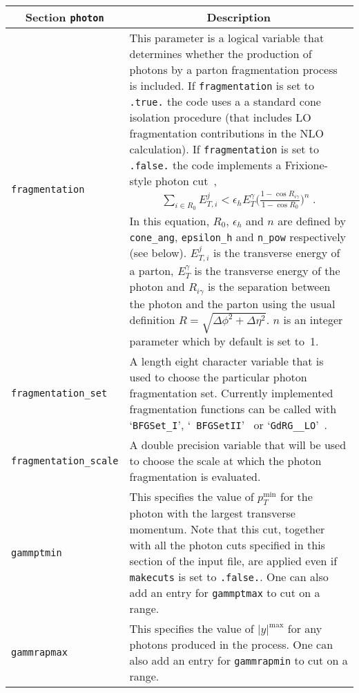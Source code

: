 	\begin{longtable}{p{3.5cm}p{12cm}}
		\toprule
		\multicolumn{1}{c}{{\textbf{Section} \texttt{photon}}} & \multicolumn{1}{c}{{\textbf{Description}}} \\ 
		\midrule
		{\tt fragmentation} &  This parameter is a logical variable that determines whether the production of photons 
		by a parton 
		fragmentation process is included. If {\tt fragmentation} is set to {\tt .true.} the code uses a a standard 
		cone isolation
		procedure (that includes LO fragmentation contributions in the NLO calculation).
		If {\tt fragmentation} is set to {\tt .false.} the code implements
		a Frixione-style photon cut~\cite{Frixione:1998jh},
		\begin{eqnarray}
		\sum_{i \in R_0} E_{T,i}^j  < \epsilon_h E_{T}^{\gamma} \bigg(\frac{1-\cos{R_{i\gamma}}}{1-\cos{R_0}}\bigg)^{n} 
		\;.
		\label{frixeq}
		\end{eqnarray}
		In this equation, $R_0$, $\epsilon_h$ and $n$ are defined by {\tt cone\_ang}, {\tt epsilon\_h} 
		and {\tt n\_pow}  respectively (see below).
		$E_{T,i}^{j}$ is the transverse energy of a parton, $E_{T}^\gamma$ is the
		transverse energy of the photon and $R_{i\gamma}$ is the separation between the photon and the parton using the 
		usual definition 
		$R=\sqrt{\Delta\phi^2+\Delta\eta^2}$. $n$ is an integer parameter which by default is set to~1. \\
		
		{\tt fragmentation\_set} & A length eight character variable that is used to choose the particular photon 
		fragmentation set.
		Currently implemented fragmentation functions can be called with `{\tt BFGSet\_I}', `{\tt 
			BFGSetII}'~\cite{Bourhis:1997yu} or `{\tt GdRG\_\_LO}'~\cite{GehrmannDeRidder:1998ba}. \\
		
		{\tt fragmentation\_scale} & A double precision variable that will be used to choose the scale 
		at which the photon fragmentation is evaluated. \\
		
		{\tt gammptmin} & This specifies the value
		of $p_T^{\mathrm{min}}$ for the photon with the largest transverse momentum.
		Note that this cut, together with all the photon cuts specified in this section
		of the input file, are applied even if {\tt makecuts} is set to {\tt .false.}.
		One can also add an entry for \texttt{gammptmax} to cut on a range. \\
		
		{\tt gammrapmax} & This specifies the value
		of $|y|^{\mathrm{max}}$ for any photons produced in the process. One can also add an entry
		for \texttt{gammrapmin} to cut on a range. \\
		

\end{longtable}
